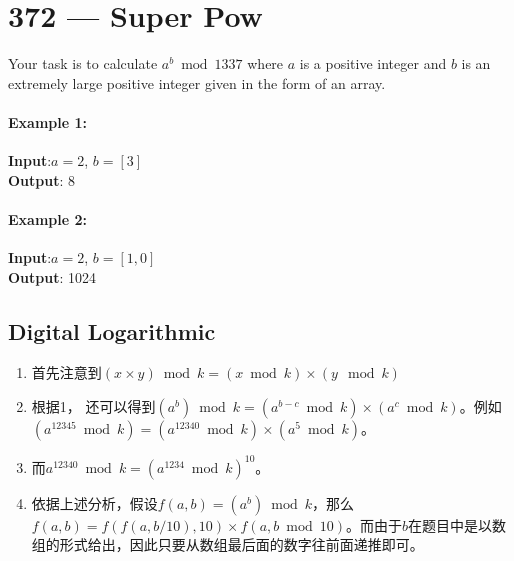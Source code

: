 \section{372 --- Super Pow}
Your task is to calculate $ a^b \bmod 1337$ where $ a $ is a positive integer and $ b $ is an extremely large positive integer given in the form of an array.

\paragraph{Example 1:}

\begin{flushleft}
\textbf{Input}:$  a = 2 $, $ b = [3] $
\\
\textbf{Output}: 8
\end{flushleft}

\paragraph{Example 2:}

\begin{flushleft}
\textbf{Input}:$  a = 2 $, $ b = [1,0] $
\\
\textbf{Output}: 1024
\end{flushleft}

\subsection{Digital Logarithmic}
\begin{enumerate}
\item 首先注意到$(x\times y)\bmod k = (x\bmod k)\times (y\mod k)$ \item 根据1， 还可以得到$(a^b)\bmod k = (a^{b-c}\bmod k)\times (a^c\bmod k)$。例如$(a^{12345}\bmod k) = (a^{12340}\bmod k)\times (a^5\bmod k)$。
\item 而$a^{12340}\bmod k = (a^{1234}\bmod k)^{10}$。
\item 依据上述分析，假设$f(a, b) = (a^b)\bmod k$，那么$f(a,b) = f(f(a, b/10), 10)\times f(a, b\bmod 10)$。而由于$b$在题目中是以数组的形式给出，因此只要从数组最后面的数字往前面递推即可。
\end{enumerate}

